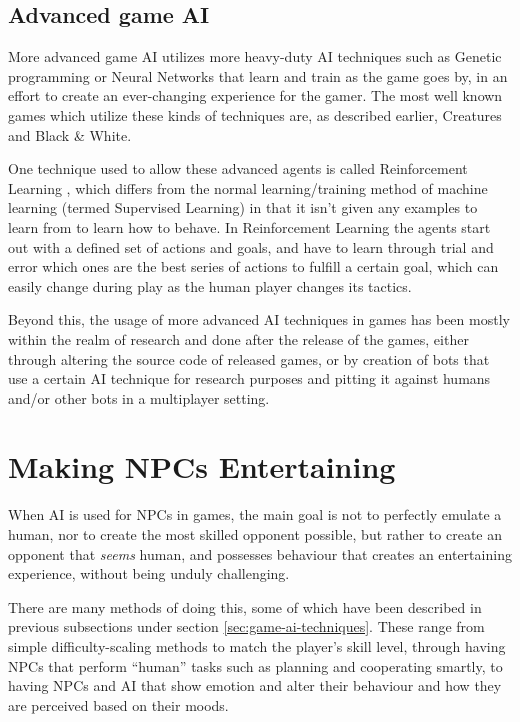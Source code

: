 \subsection{Advanced game AI}
\label{sec:advanced-game-ai}

More advanced game AI utilizes more heavy-duty AI techniques such as Genetic
programming or Neural Networks that learn and train as the game goes by, in an
effort to create an ever-changing experience for the gamer. The most well known
games which utilize these kinds of techniques are, as described earlier,
Creatures \citep{grand1997creatures} and Black \& White.

One technique used to allow these advanced agents is called Reinforcement
Learning \citep{merrick2006motivated,sutton1998reinforcement}, which differs
from the normal learning/training method of machine learning (termed Supervised
Learning) in that it isn't given any examples to learn from to learn how to
behave. In Reinforcement Learning the agents start out with a defined set of
actions and goals, and have to learn through trial and error which ones are the
best series of actions to fulfill a certain goal, which can easily change during
play as the human player changes its tactics.

Beyond this, the usage of more advanced AI techniques in games has been mostly
within the realm of research and done after the release of the games, either
through altering the source code of released games, or by creation of bots that
use a certain AI technique for research purposes and pitting it against humans
and/or other bots in a multiplayer setting.


\section{Making NPCs Entertaining}
\label{cha:npc-entert-value}

When AI is used for NPCs in games, the main goal is not to perfectly emulate a
human, nor to create the most skilled opponent possible, but rather to create an
opponent that \emph{seems} human, and possesses behaviour that creates an
entertaining experience, without being unduly challenging.

There are many methods of doing this, some of which have been described in
previous subsections under section \ref{sec:game-ai-techniques}. These range
from simple difficulty-scaling methods to match the player's skill level,
through having NPCs that perform ``human'' tasks such as planning and
cooperating smartly, to having NPCs and AI that show emotion and alter their
behaviour and how they are perceived based on their moods.

